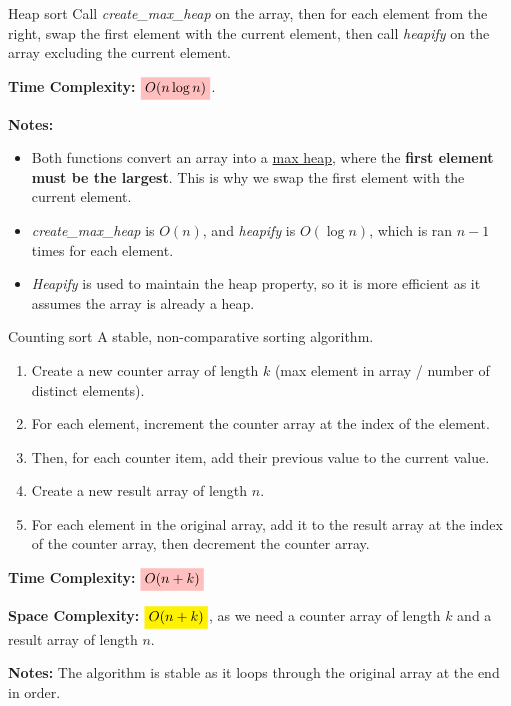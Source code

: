 \begin{definition}
    {Heap sort}
    Call \textit{create\_max\_heap} on the array, then for each element from the right, swap the first element with the current element, then call \textit{heapify} on the array excluding the current element.

    \textbf{Time Complexity:} $\mathcolorbox{pink}{O(n \log n)}$.

    \textbf{Notes:}
    \begin{itemize}
        \item Both functions convert an array into a \hyperref[subsubsec:heaps]{max heap}, where the \textbf{first element must be the largest}. This is why we swap the first element with the current element.
        \item \textit{create\_max\_heap} is $O(n)$, and \textit{heapify} is $O(\log n)$, which is ran $n-1$ times for each element.
        \item \textit{Heapify} is used to maintain the heap property, so it is more efficient as it assumes the array is already a heap.
    \end{itemize}
\end{definition}
\label{def:heapsort}

\begin{definition}
    {Counting sort}
    A stable, non-comparative sorting algorithm.
    \begin{enumerate}
        \item Create a new counter array of length $k$ (max element in array / number of distinct elements).
        \item For each element, increment the counter array at the index of the element.
        \item Then, for each counter item, add their previous value to the current value.
        \item Create a new result array of length $n$.
        \item For each element in the original array, add it to the result array at the index of the counter array, then decrement the counter array.
    \end{enumerate}

    \textbf{Time Complexity:} $\mathcolorbox{pink}{O(n+k)}$

    \textbf{Space Complexity:} $\mathcolorbox{yellow}{O(n+k)}$, as we need a counter array of length $k$ and a result array of length $n$.

    \textbf{Notes:} The algorithm is stable as it loops through the original array at the end in order.
\end{definition}

